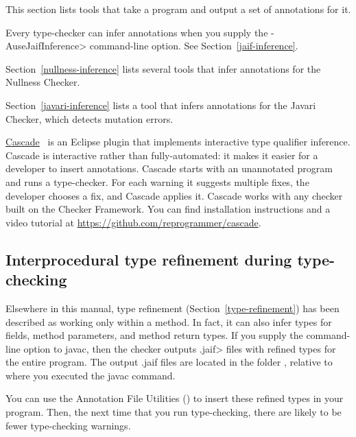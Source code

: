 This section lists tools that take a program and output a set of
annotations for it.

Every type-checker can infer annotations when you supply the
\<-AuseJaifInference> command-line option.  See Section~\ref{jaif-inference}.

Section~\ref{nullness-inference} lists several tools that infer
annotations for the Nullness Checker.

Section~\ref{javari-inference} lists a tool that infers
annotations for the Javari Checker, which detects mutation errors.

\href{https://github.com/reprogrammer/cascade/}{Cascade}~\cite{VakilianPEJ2014}
is an Eclipse plugin that implements interactive type qualifier inference.
Cascade is interactive rather than fully-automated:  it makes it easier for
a developer to insert annotations.
Cascade starts with an unannotated program and runs a type-checker.  For each
warning it suggests multiple fixes, the developer chooses a fix, and
Cascade applies it.  Cascade works with any checker built on the Checker
Framework.
You can find installation instructions and a video tutorial at \url{https://github.com/reprogrammer/cascade}.


\subsection{Interprocedural type refinement during type-checking\label{jaif-inference}}

Elsewhere in this manual, type refinement (Section~\ref{type-refinement})
has been described as working only within a method.  In fact, it can also
infer types for fields, method parameters, and method return types.  If you
supply the  command-line option to javac, then the
checker outputs \<.jaif> files with refined types for the entire program.
The output .jaif files are located in the folder ,
relative to where you executed the javac command.

You can use the Annotation File Utilities
() to
insert these refined types in your program.  Then, the next time that you
run type-checking, there are likely to be fewer type-checking warnings.

